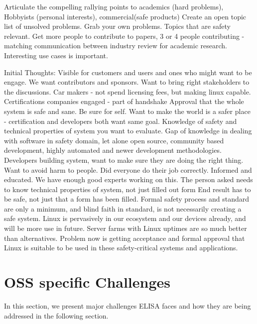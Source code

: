\documentclass[12pt]{ElisaPaper}
\begin{document}
Articulate the compelling rallying points to 
academics (hard problems), 
Hobbyists (personal interests),
commercial(safe products)    
Create an open topic list of unsolved problems.  
Grab your own problems.   
 Topics that are safety relevant.    
 Get more people to contribute to papers,  3 or 4 people contributing - matching communication between industry review for academic research. 
Interesting use cases is important. 



Initial Thoughts:
Visible for customers and users and ones who might want to be engage.
We want contributors and sponsors.
Want to bring right stakeholders to the discussions.
Car makers - not spend licensing fees, but making linux capable.
Certifications companies engaged - part of handshake
Approval that the whole system is safe and sane.
Be sure for self. 
Want to make the world is a safer place - certification and developers both want same goal.
Knowledge of safety and technical properties of system you want to evaluate.
Gap of knowledge in dealing with software in safety domain,  let alone open source, community based development,  highly automated and newer development methodologies.
Developers building system, want to make sure they are doing the right thing.
Want to avoid harm to people.
Did everyone do their job correctly.
Informed and educated.
We have enough good experts working on this.    
The person asked needs to know technical properties of system,  not just filled out form
End result has to be safe,  not just that a form has been filled.
Formal safety process and standard are only a minimum,  and blind faith in standard, is not necessarily creating a safe system.
Linux is pervasively in our ecosystem and our devices already,  and will be more use in future.
Server farms with Linux uptimes are so much better than alternatives.   
Problem now is getting acceptance and formal approval that Linux is suitable to be used in these safety-critical systems and applications.  



\section{OSS specific Challenges}
\label{sec:OSS specific Challenges}
In this section, we present major challenges ELISA faces and how they are being addressed in the following section.
\end{document}
